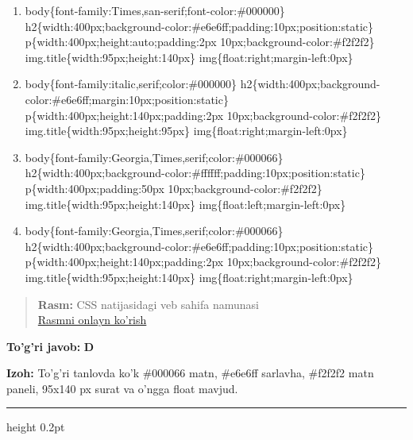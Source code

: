 \documentclass[10pt,a4paper,oneside]{article}
\begin{document}
\begin{enumerate}[label=\Alph*),leftmargin=9mm]
\item body\{font-family:Times,san-serif;font-color:\#000000\} h2\{width:400px;background-color:\#e6e6ff;padding:10px;position:static\} p\{width:400px;height:auto;padding:2px 10px;background-color:\#f2f2f2\} img.title\{width:95px;height:140px\} img\{float:right;margin-left:0px\}
\item body\{font-family:italic,serif;color:\#000000\} h2\{width:400px;background-color:\#e6e6ff;margin:10px;position:static\} p\{width:400px;height:140px;padding:2px 10px;background-color:\#f2f2f2\} img.title\{width:95px;height:95px\} img\{float:right;margin-left:0px\}
\item body\{font-family:Georgia,Times,serif;color:\#000066\} h2\{width:400px;background-color:\#ffffff;padding:10px;position:static\} p\{width:400px;padding:50px 10px;background-color:\#f2f2f2\} img.title\{width:95px;height:140px\} img\{float:left;margin-left:0px\}
\item body\{font-family:Georgia,Times,serif;color:\#000066\} h2\{width:400px;background-color:\#e6e6ff;padding:10px;position:static\} p\{width:400px;height:140px;padding:2px 10px;background-color:\#f2f2f2\} img.title\{width:95px;height:140px\} img\{float:right;margin-left:0px\}
\end{enumerate}
\begin{quote}\footnotesize\color{muted}\textbf{Rasm:} CSS natijasidagi veb sahifa namunasi\\
\href{https://github.com/sarvar9417/attestatsiya/blob/main/public/kuzgi-demo/demo_q21_css.svg}{Rasmni onlayn ko'rish}
\end{quote}
\begin{tcolorbox}[enhanced,breakable,colback=teal!4,colframe=teal!45!black,boxrule=0.45pt,arc=1.2mm,left=2.8mm,right=2.8mm,top=2mm,bottom=2mm,before skip=2mm,after skip=2mm]
\textbf{\color{teal}To'g'ri javob:} \textbf{D}
\par\smallskip
\textbf{Izoh:} To'g'ri tanlovda ko'k \#000066 matn, \#e6e6ff sarlavha, \#f2f2f2 matn paneli, 95x140 px surat va o'ngga float mavjud.
\end{tcolorbox}
\vspace{2mm}\hrule height 0.2pt \vspace{4mm}
\end{document}
